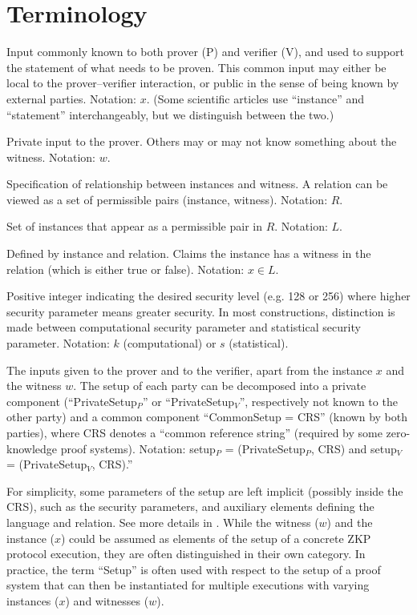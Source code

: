 \section{Terminology}
\label{security:terminology}


Input commonly known to both prover (P) and verifier (V), and used to support the statement of what needs to be proven.
This common input may either be local to the prover--verifier interaction, or public in the sense of being known by external parties. Notation: $x$.
(Some scientific articles use ``instance'' and ``statement'' interchangeably, but we distinguish between the two.)
\loosen

Private input to the prover. Others may or may not know something about the witness. 
Notation: $w$.
 
Specification of relationship between instances and witness.
A relation can be viewed as a set of permissible pairs (instance, witness). 
Notation: $R$.

Set of instances that appear as a permissible pair in $R$. 
Notation: $L$.

Defined by instance and relation.
Claims the instance has a witness in the relation (which is either true or false). 
Notation: $x \in L$.

Positive integer indicating the desired security level (e.g. 128 or 256) where higher security parameter means greater security.
In most constructions, distinction is made between computational security parameter and statistical security parameter. 
Notation: $k$ (computational) or $s$ (statistical).

The inputs given to the prover and to the verifier, apart from the instance $x$ and the witness $w$. 
The setup of each party can be decomposed into a private component (``PrivateSetup$_P$'' or ``PrivateSetup$_V$'', respectively not known to the other party) and a common component ``CommonSetup = CRS'' (known by both parties), where CRS denotes a ``common reference string'' (required by some zero-knowledge proof systems). 
Notation: setup$_P$ = (PrivateSetup$_P$, CRS) and setup$_V$ = (PrivateSetup$_V$, CRS).''
\loosen

For simplicity, some parameters of the setup are left implicit (possibly inside the CRS), such as the security parameters, and auxiliary elements defining the language and relation.
See more details in .
While the witness ($w$) and the instance ($x$) could be assumed as elements of the setup of a concrete ZKP protocol execution, they are often distinguished in their own category. 
In practice, the term ``Setup'' is often used with respect to the setup of a proof system that can then be instantiated for multiple executions with varying instances ($x$) and witnesses ($w$).


